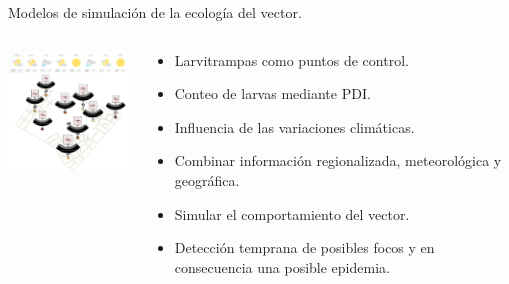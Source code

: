
\begin{frame}[t]{Modelos de simulación de la ecología del vector.}
  \begin{center}
   \begin{columns}[T]
        \begin{column}[T]{4cm}
             \includegraphics[width=4.5cm]{./graphics/larvitrmpas-clima.png}
        \end{column}
        \begin{column}[T]{7cm}
          \begin{itemize}
          \item Larvitrampas como puntos de control.
          \item Conteo de larvas mediante PDI.
          \item Influencia de las variaciones climáticas.
          \item Combinar información regionalizada, meteorológica y geográfica.
          \item Simular el comportamiento del vector.
          \item Detección temprana de posibles focos y en consecuencia una posible epidemia.
          \end{itemize}
        \end{column}
    \end{columns}
  \end{center}
\end{frame}

